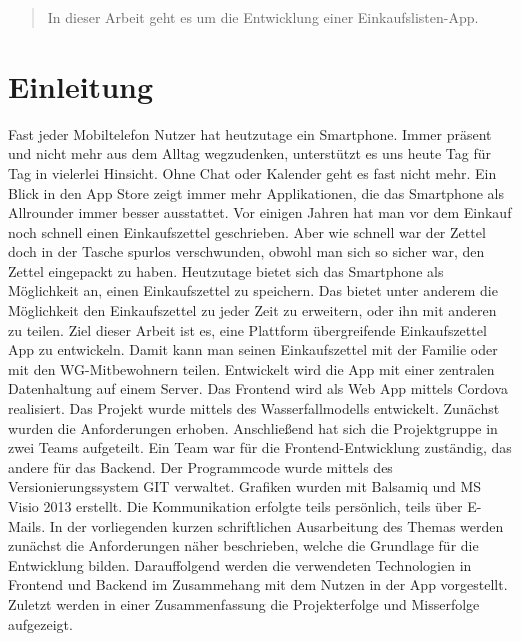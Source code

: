 \documentclass[10pt, conference, compsocconf]{IEEEtran}
\begin{document}
\begin{abstract}
In dieser Arbeit geht es um die Entwicklung einer Einkaufslisten-App.

\end{abstract}

%


%
\IEEEpeerreviewmaketitle



\section{Einleitung}
Fast jeder Mobiltelefon Nutzer hat heutzutage ein Smartphone. Immer pr\"asent und nicht mehr aus dem Alltag wegzudenken, unterst\"utzt es uns heute Tag f\"ur Tag in vielerlei Hinsicht. Ohne Chat oder Kalender geht es fast nicht mehr. Ein Blick in den App Store zeigt immer mehr Applikationen, die das Smartphone als Allrounder immer besser ausstattet. 
Vor einigen Jahren hat man vor dem Einkauf noch schnell einen Einkaufszettel geschrieben. Aber wie schnell war der Zettel doch in der Tasche spurlos verschwunden, obwohl man sich so sicher war, den Zettel eingepackt zu haben. Heutzutage bietet sich das Smartphone als M\"oglichkeit an, einen Einkaufszettel zu speichern. Das bietet unter anderem die M\"oglichkeit den Einkaufszettel zu jeder Zeit zu erweitern, oder ihn mit anderen zu teilen. 
Ziel dieser Arbeit ist es, eine Plattform \"ubergreifende Einkaufszettel App zu entwickeln. Damit kann man seinen Einkaufszettel mit der Familie oder mit den WG-Mitbewohnern teilen. Entwickelt wird die App mit einer zentralen Datenhaltung auf einem Server. Das Frontend wird als Web App mittels Cordova realisiert. Das Projekt wurde mittels des Wasserfallmodells entwickelt. Zun\"achst wurden die Anforderungen erhoben. Anschlie{\ss}end hat sich die Projektgruppe in zwei Teams aufgeteilt. Ein Team war f\"ur die Frontend-Entwicklung zust\"andig, das andere f\"ur das Backend. Der Programmcode wurde mittels des Versionierungssystem GIT verwaltet. Grafiken wurden mit Balsamiq und MS Visio 2013 erstellt. Die Kommunikation erfolgte teils pers\"onlich, teils \"uber E-Mails.
In der vorliegenden kurzen schriftlichen Ausarbeitung des Themas werden zun\"achst die Anforderungen n\"aher beschrieben, welche die Grundlage f\"ur die Entwicklung bilden. Darauffolgend werden die verwendeten Technologien in Frontend und Backend im Zusammehang mit dem Nutzen in der App vorgestellt. Zuletzt werden in einer Zusammenfassung die Projekterfolge und Misserfolge aufgezeigt. 
\end{document}
